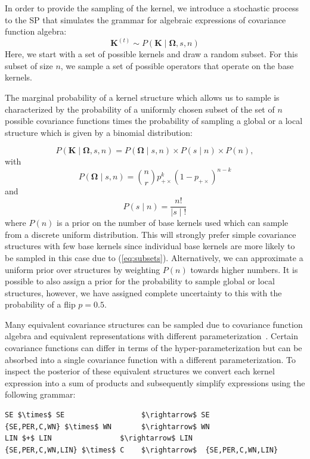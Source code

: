 \documentclass{article} %
\begin{document}
In order to provide the sampling of the kernel, we introduce a stochastic process to the SP that simulates the grammar for algebraic expressions of covariance function algebra:
\begin{equation}
\mathbf{K}^{(t)} \sim  P(\mathbf{K} \mid \bm{\Omega},s,n)
\end{equation}
Here, we start with a set of possible kernels and draw a random subset. For this subset of size $n$, we sample a set of possible operators that operate on the base kernels. 

The marginal probability of a kernel structure which allows us to sample  is characterized by the probability of a uniformly chosen subset of the set of $n$ possible covariance functions times the probability of sampling a global or a local structure which is given by a binomial distribution: 

\begin{equation}
P(\mathbf{K} \mid \bm{\Omega},s,n) = P(\bm{\Omega} \mid s,n)\times P(s \mid n) \times P(n),
\end{equation}
with
\begin{equation}
P(\bm{\Omega} \mid s,n)= {n \choose r}  p_{+\times}^k (1 - p_{+\times})^{n-k}
\end{equation}
and
\begin{equation}
\label{eq:subsets}
P(s \mid n) = \frac{n!}{ \mid s \mid !}
\end{equation}
where $P(n)$ is a prior on the number of base kernels used which can sample from a discrete uniform distribution. This will strongly prefer simple covariance structures with few base kernels since individual base kernels are more likely to be sampled in this case due to (\ref{eq:subsets}). Alternatively, we can approximate a uniform prior over structures by weighting $P(n)$ towards higher numbers. It is possible to also assign a prior for the probability to sample global or local structures, however, we have assigned complete uncertainty to this with the probability of a flip $p = 0.5$.



Many equivalent covariance structures can be sampled due to covariance function algebra and equivalent representations with different parameterization~\citep{lloyd2014automatic}. Certain covariance functions can differ in terms of the hyper-parameterization but can be absorbed into a single covariance function with a different parameterization. To inspect the posterior of these equivalent structures we convert each kernel expression into a sum of products and subsequently simplify expressions using the following grammar:
\begin{minipage}{\linewidth}

\begin{lstlisting}[frame=single,label=alg:simplify,caption=Grammar to simplify expressions,mathescape]
SE $\times$ SE                  $\rightarrow$ SE 
{SE,PER,C,WN} $\times$ WN       $\rightarrow$ WN
LIN $+$ LIN                $\rightarrow$ LIN
{SE,PER,C,WN,LIN} $\times$ C    $\rightarrow$  {SE,PER,C,WN,LIN} 
\end{lstlisting}

\end{minipage}
\end{document}

